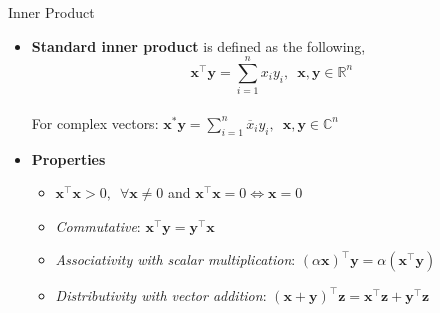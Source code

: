 \documentclass[aspectratio=169]{beamer}
\let\olditem\item
\renewcommand{\item}{\setlength{\itemsep}{\fill}\olditem}
\begin{document}
\begin{frame}[t]{Inner Product}
\begin{itemize}
    \item \textbf{Standard inner product} is defined as the following,
    $$\mathbf{x}^\top\mathbf{y} = \sum_{i=1}^{n}x_iy_i, \,\,\, \mathbf{x}, \mathbf{y} \in \mathbb{R}^n$$\\
    For complex vectors:  $\mathbf{x}^{*}\mathbf{y} = \sum_{i=1}^{n}\overline{x}_iy_i, \,\,\, \mathbf{x}, \mathbf{y} \in \mathbb{C}^n$
    \item \textbf{Properties}
    \begin{itemize}
        \item $\mathbf{x}^\top\mathbf{x} > 0, \,\,\, \forall \mathbf{x} \neq 0$ and $\mathbf{x}^\top\mathbf{x} = 0 \Leftrightarrow \mathbf{x} = 0$
        \item \textit{Commutative}: $\mathbf{x}^\top\mathbf{y} = \mathbf{y}^\top\mathbf{x}$
        \item \textit{Associativity with scalar multiplication}: $\left(\alpha \mathbf{x}\right)^\top\mathbf{y} = \alpha \left(\mathbf{x}^\top\mathbf{y}\right)$
        \item \textit{Distributivity with vector addition}: $\left(\mathbf{x} + \mathbf{y}\right)^\top\mathbf{z} = \mathbf{x}^\top\mathbf{z} + \mathbf{y}^\top\mathbf{z}$
    \end{itemize}
\end{itemize}
\end{frame}
\end{document}
